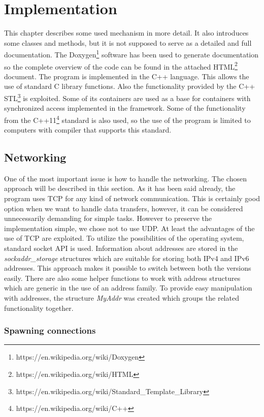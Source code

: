 \chapter{Implementation}\label{implementation}

This chapter describes some used mechanism in more detail. It also
introduces some classes and methods, but it is not supposed to serve as
a detailed and full documentation. The
Doxygen\footnote{https://en.wikipedia.org/wiki/Doxygen} software has
been used to generate documentation so the complete overview of the code
can be found in the attached
HTML\footnote{https://en.wikipedia.org/wiki/HTML} document. The program
is implemented in the C++ language. This allows the use of standard C
library functions. Also the functionality provided by the C++
STL\footnote{https://en.wikipedia.org/wiki/Standard\_Template\_Library}
is exploited. Some of its containers are used as a base for containers
with synchronized access implemented in the framework. Some of the
functionality from the C++11\footnote{https://en.wikipedia.org/wiki/C++}
standard is also used, so the use of the program is limited to computers
with compiler that supports this standard.

\section{Networking}\label{networking}

One of the most important issue is how to handle the networking. The
chosen approach will be described in this section. As it has been said
already, the program uses TCP for any kind of network communication.
This is certainly good option when we want to handle data transfers,
however, it can be considered unnecessarily demanding for simple tasks.
However to preserve the implementation simple, we chose not to use UDP.
At least the advantages of the use of TCP are exploited. To utilize the
possibilities of the operating system, standard socket API is used.
Information about addresses are stored in the \textit{sockaddr\_storage}
structures which are suitable for storing both IPv4 and IPv6 addresses.
This approach makes it possible to switch between both the versions
easily. There are also some helper functions to work with address
structures which are generic in the use of an address family. To provide
easy manipulation with addresses, the structure \textit{MyAddr} was
created which groups the related functionality together.

\subsection{Spawning connections}\label{spawning-connections}

